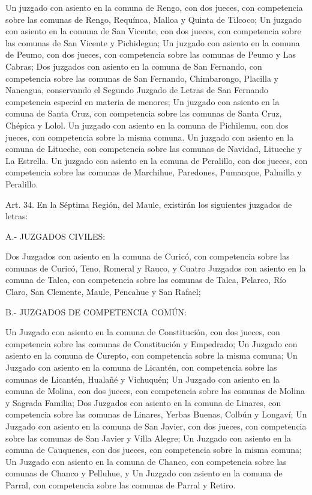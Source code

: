     Un juzgado con asiento en la comuna de Rengo, con dos jueces, con competencia sobre las comunas de Rengo, Requínoa, Malloa y Quinta de Tilcoco;
    Un juzgado con asiento en la comuna de San Vicente, con dos jueces, con competencia sobre las comunas de San Vicente y Pichidegua;
    Un juzgado con asiento en la comuna de Peumo, con dos jueces, con competencia sobre las comunas de Peumo y Las Cabras;
    Dos juzgados con asiento en la comuna de San Fernando, con competencia sobre las comunas de San Fernando, Chimbarongo, Placilla y Nancagua, conservando el Segundo Juzgado de Letras de San Fernando competencia especial en materia de menores;
    Un juzgado con asiento en la comuna de Santa Cruz, con competencia sobre las comunas de Santa Cruz, Chépica y Lolol.
    Un juzgado con asiento en la comuna de Pichilemu, con dos jueces, con competencia sobre la misma comuna.
    Un juzgado con asiento en la comuna de Litueche, con competencia sobre las comunas de Navidad, Litueche y La Estrella.
    Un juzgado con asiento en la comuna de Peralillo, con dos jueces, con competencia sobre las comunas de Marchihue, Paredones, Pumanque, Palmilla y Peralillo.


    Art. 34. En la Séptima Región, del Maule, existirán los siguientes juzgados de letras:

    A.- JUZGADOS CIVILES:

    Dos Juzgados con asiento en la comuna de Curicó, con competencia sobre las comunas de Curicó, Teno, Romeral y Rauco, y
    Cuatro Juzgados con asiento en la comuna de Talca, con competencia sobre las comunas de Talca, Pelarco, Río Claro, San Clemente, Maule, Pencahue y San Rafael;

    B.- JUZGADOS DE COMPETENCIA COMÚN:

    Un Juzgado con asiento en la comuna de Constitución, con dos jueces, con competencia sobre las comunas de Constitución y Empedrado;
    Un Juzgado con asiento en la comuna de Curepto, con competencia sobre la misma comuna;
    Un Juzgado con asiento en la comuna de Licantén, con competencia sobre las comunas de Licantén, Hualañé y Vichuquén;
    Un Juzgado con asiento en la comuna de Molina, con dos jueces, con competencia sobre las comunas de Molina y Sagrada Familia;
    Dos Juzgados con asiento en la comuna de Linares, con competencia sobre las comunas de Linares, Yerbas Buenas, Colbún y Longaví;
    Un Juzgado con asiento en la comuna de San Javier, con dos jueces, con competencia sobre las comunas de San Javier y Villa Alegre;
    Un Juzgado con asiento en la comuna de Cauquenes, con dos jueces, con competencia sobre la misma comuna;
    Un Juzgado con asiento en la comuna de Chanco, con competencia sobre las comunas de Chanco y Pelluhue, y
    Un Juzgado con asiento en la comuna de Parral, con competencia sobre las comunas de Parral y Retiro.


